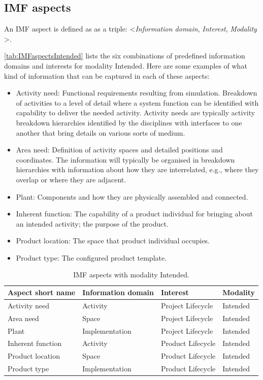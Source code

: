 \documentclass[../main.tex]{subfiles}
\begin{document}
\subsection{IMF aspects}
An IMF aspect is  defined  as as a triple: {\textless}\textit{Information domain}, \textit{Interest}, \textit{Modality} {\textgreater}.  

\autoref{tab:IMFaspectsIntended} lists the six combinations of predefined information domains and interests
for modality Intended. Here are some examples of what kind of information that can be captured in each of these aspects: 
\begin{itemize}
    \item Activity need: Functional requirements resulting from simulation. Breakdown of
    activities to a level of detail where a system function can be identified with capability to
    deliver the needed activity. Activity needs are typically activity breakdown hierarchies identified by the disciplines with interfaces to one another that bring details on various sorts of medium. 
    \item Area need: Definition of activity spaces and detailed positions and coordinates. The information will typically be organised in breakdown hierarchies with information about how they are interrelated, e.g., where they overlap or where they are adjacent. 
    \item Plant: Components and how they are physically assembled and connected. 
    \item Inherent function: The capability of a product  individual for bringing about an intended activity; the purpose of the product.  
    \item Product location: The space that product  individual occupies.
    \item Product type: The configured product template. 
\end{itemize}

\begin{table}
    \centering
    \caption{IMF aspects with modality Intended.}
    \label{tab:IMFaspectsIntended}
    \begin{tabular}{llll}
     \toprule
        \textbf{Aspect short name}  & \textbf{Information domain} & \textbf{Interest} & \textbf{Modality}\\ \midrule
         Activity need&  Activity & Project Lifecycle & Intended\\
         Area need&  Space & Project Lifecycle & Intended \\
         Plant&  Implementation & Project Lifecycle & Intended\\
         Inherent function &  Activity & Product Lifecycle & Intended\\
         Product location&  Space & Product Lifecycle & Intended \\
         Product type &  Implementation & Product Lifecycle & Intended \\
     \bottomrule
    \end{tabular}
    
\end{table}
\end{document}
